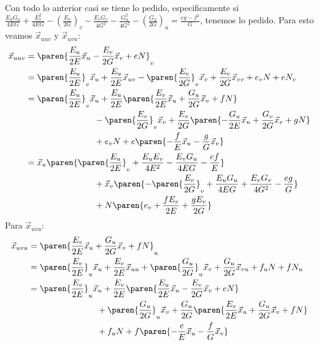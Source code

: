 \documentclass{homework}
\begin{document}
\begin{sol}
\begin{align*}
    \end{align*}
    Con todo lo anterior casi se tiene lo pedido, especificamente si \( \frac{E_u G_u}{4EG} + \frac{E_v^2}{4EG} - \left( \frac{E_v}{2G} \right)_v - \frac{E_vG_v}{4G^2} - \frac{G_u^2}{4G^2} - \left( \frac{G_u}{2G} \right)_u=\frac{eg-f^2}{G}\), tenemos lo pedido. Para esto veamos \(\vec{x}_{uuv}\) y \(\vec{x}_{uvu}\):
    \begin{align*}
        \vec{x}_{uuv}&=\paren{\frac{E_u}{2E} \vec{x}_u - \frac{E_v}{2G} \vec{x}_v + eN}_v\\
        &=\paren{\frac{E_u}{2E}}_v \vec{x}_u+\frac{E_u}{2E}\vec{x}_{uv} - \paren{\frac{E_v}{2G}}_v \vec{x}_v+\frac{E_v}{2G}\vec{x}_{vv} + e_vN+eN_v\\
        &=\paren{\frac{E_u}{2E}}_v \vec{x}_u+\frac{E_u}{2E}\paren{\frac{E_v}{2E} \vec{x}_u + \frac{G_u}{2G} \vec{x}_v + fN} \\
        &{} \qquad {} \qquad {} \qquad {} \qquad - \paren{\frac{E_v}{2G}}_v \vec{x}_v+\frac{E_v}{2G}\paren{-\frac{G_u}{2E} \vec{x}_u + \frac{G_v}{2G} \vec{x}_v + gN} \\
        &{} \qquad {} \qquad {} \qquad {} \qquad + e_vN+e\paren{ - \frac{f}{E} \vec{x}_u - \frac{g}{G} \vec{x}_v}\\
        &=\vec{x}_u\paren{\paren{\frac{E_u}{2E}}_v+\frac{E_uE_v}{4E^2}-\frac{E_vG_u}{4EG}-\frac{ef}{E}}\\
        &{} \qquad {} \qquad {} \qquad {} \qquad + \vec{x}_v\paren{-\paren{\frac{E_v}{2G}}_v+\frac{E_uG_u}{4EG}+\frac{E_vG_v}{4G^2}-\frac{eg}{G}}\\
        &{} \qquad {} \qquad {} \qquad {} \qquad + N\paren{e_v+\frac{fE_v}{2E}+\frac{gE_v}{2G}}\\
    \end{align*}
    Para \(\vec{x}_{uvu}\):
    \begin{align*}
        \vec{x}_{uvu}&=\paren{\frac{E_v}{2E} \vec{x}_u + \frac{G_u}{2G} \vec{x}_v + fN}_u\\
        &=\paren{\frac{E_v}{2E}}_u\vec{x}_u+\frac{E_v}{2E}\vec{x}_{uu}+\paren{\frac{G_u}{2G}}_u\vec{x}_v+\frac{G_u}{2G}\vec{x}_{vu}+f_uN+fN_u\\
        &=\paren{\frac{E_v}{2E}}_u\vec{x}_u+\frac{E_v}{2E}\paren{\frac{E_u}{2E} \vec{x}_u - \frac{E_v}{2G} \vec{x}_v + eN}\\
        &{} \qquad {} \qquad {} \qquad {} \qquad+\paren{\frac{G_u}{2G}}_u\vec{x}_v+\frac{G_u}{2G}\paren{\frac{E_v}{2E} \vec{x}_u + \frac{G_u}{2G} \vec{x}_v + fN}\\
        &{} \qquad {} \qquad {} \qquad {} \qquad+f_uN+f\paren{- \frac{e}{E} \vec{x}_u - \frac{f}{G} \vec{x}_v}\\

\end{align*}
\end{sol}
\end{document}
